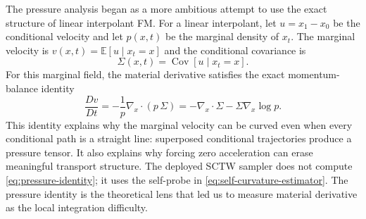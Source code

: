The pressure analysis began as a more ambitious attempt to use the exact structure of linear
interpolant FM. For a linear interpolant, let $u=x_1-x_0$ be the conditional velocity and let
$p(x,t)$ be the marginal density of $x_t$. The marginal velocity is
$v(x,t)=\mathbb{E}[u \mid x_t=x]$ and the conditional covariance is
\begin{equation}
  \Sigma(x,t)
  =
  \operatorname{Cov}[u \mid x_t=x].
  \label{eq:conditional-covariance}
\end{equation}
For this marginal field, the material derivative satisfies the exact momentum-balance identity
\begin{equation}
  \frac{D v}{D t}
  =
  -\frac{1}{p}\nabla_x \cdot \left(p\,\Sigma\right)
  =
  -\nabla_x \cdot \Sigma - \Sigma \nabla_x \log p.
  \label{eq:pressure-identity}
\end{equation}
This identity explains why the marginal velocity can be curved even when every conditional path
is a straight line: superposed conditional trajectories produce a pressure tensor. It also explains
why forcing zero acceleration can erase meaningful transport structure. The deployed SCTW sampler
does not compute \cref{eq:pressure-identity}; it uses the self-probe in
\cref{eq:self-curvature-estimator}. The pressure identity is the theoretical lens that led us to
measure material derivative as the local integration difficulty.
